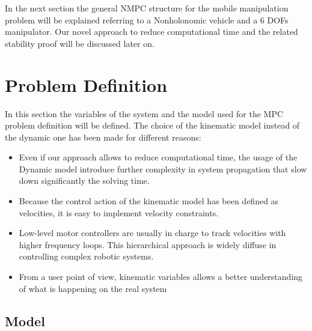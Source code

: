 In the next section the general NMPC structure for the mobile manipulation problem will be explained referring to a Nonholonomic vehicle and a 6 DOFs manipulator. Our novel approach to reduce computational time and the related stability proof will be discussed later on.

\section{Problem Definition}

In this section the variables of the system and the model used for the MPC problem definition will be defined. The choice of the kinematic model instead of the dynamic one has been made for different reasons:

\begin{itemize}
\item Even if our approach allows to reduce computational time, the usage of the Dynamic model introduce further complexity in system propagation that slow down significantly the solving time.
\item Because the control action of the kinematic model has been defined as velocities, it is easy to implement velocity constraints.
\item Low-level motor controllers are usually in charge to track velocities with higher frequency loops. This hierarchical approach is widely diffuse in controlling complex robotic systems.
\item From a user point of view, kinematic variables allows a better understanding of what is happening on the real system
\end{itemize}

\subsection{Model}

